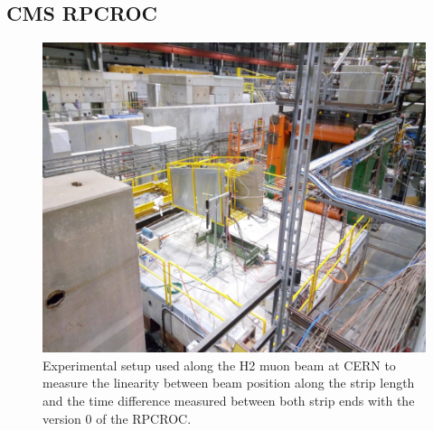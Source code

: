 		\subsection{CMS RPCROC}
		\label{chapt6:ssec:RPCROCcert}
		
	\begin{figure}[H]
		\centering
		\includegraphics[width = 0.9\linewidth]{fig/chapt6/iRPC-RPCROC-H2.png}
		\caption{\label{fig:RPCROCv0_H2} Experimental setup used along the H2 muon beam at CERN to measure the linearity between beam position along the strip length and the time difference measured between both strip ends with the version 0 of the RPCROC.}
    \end{figure}
	 
